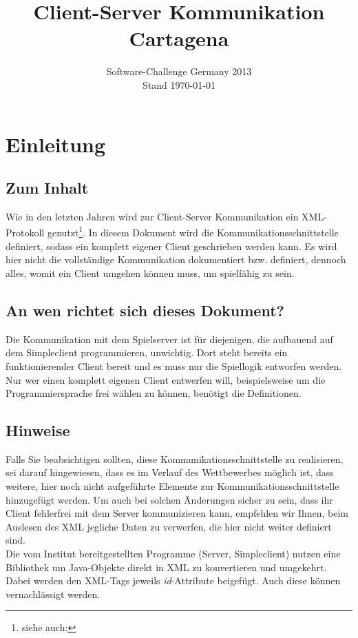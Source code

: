 \documentclass[12pt,a4paper, german, oneside]{scrartcl}
\date{Software-Challenge Germany 2013\\Stand \today}
\title{Client-Server Kommunikation Cartagena}
\begin{document}
\maketitle
\thispagestyle{empty}
\tableofcontents
\thispagestyle{empty}
\newpage
\setcounter{page}{1}
\section{Einleitung}
\subsection*{Zum Inhalt}
Wie in den letzten Jahren wird zur Client-Server Kommunikation ein XML-Protokoll genutzt\footnote{siehe auch: }. In diesem Dokument wird die Kommunikationsschnittstelle definiert, sodass ein komplett eigener Client geschrieben werden kann. Es wird hier nicht die vollständige Kommunikation dokumentiert bzw. definiert, dennoch alles, womit ein Client umgehen können muss, um spielfähig zu sein.
\subsection*{An wen richtet sich dieses Dokument?}
Die Kommunikation mit dem Spielserver ist für diejenigen, die aufbauend auf dem Simpleclient programmieren, unwichtig. Dort steht bereits ein funktionierender Client bereit und es muss nur die Spiellogik entworfen werden. \\
Nur wer einen komplett eigenen Client entwerfen will, beispielsweise um die Programmiersprache frei wählen zu können, benötigt die Definitionen.

\subsection*{Hinweise} 
Falls Sie beabsichtigen sollten, diese Kommunikationsschnittstelle zu realisieren, sei darauf hingewiesen, dass es im Verlauf des Wettbewerbes möglich ist, dass weitere, hier noch nicht aufgeführte Elemente zur Kommunikationsschnittstelle hinzugefügt werden. Um auch bei solchen Änderungen sicher zu sein, dass ihr Client fehlerfrei mit dem Server kommunizieren kann, empfehlen wir Ihnen, beim Auslesen des XML jegliche Daten zu verwerfen, die hier nicht weiter definiert sind. \bigskip \\
Die vom Institut bereitgestellten Programme (Server, Simpleclient) nutzen eine Bibliothek um Java-Objekte direkt in XML zu konvertieren und umgekehrt. Dabei werden den XML-Tags jeweils \textit{id}-Attribute beigefügt. Auch diese können vernachlässigt werden.
\end{document}

